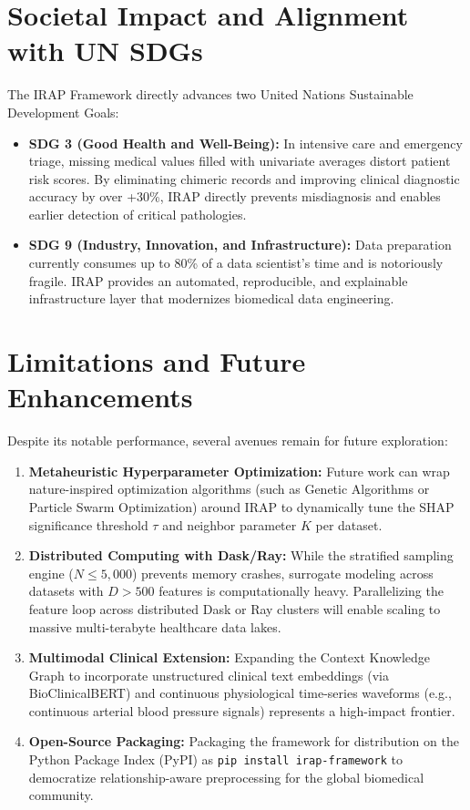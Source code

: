 \documentclass[MTech]{ugthesis}
\begin{document}
\section{Societal Impact and Alignment with UN SDGs}
The \ac{IRAP} Framework directly advances two United Nations Sustainable Development Goals:
\begin{itemize}
    \item \textbf{\ac{SDG} 3 (Good Health and Well-Being):} In intensive care and emergency triage, missing medical values filled with univariate averages distort patient risk scores. By eliminating chimeric records and improving clinical diagnostic accuracy by over +30\%, \ac{IRAP} directly prevents misdiagnosis and enables earlier detection of critical pathologies.
    \item \textbf{\ac{SDG} 9 (Industry, Innovation, and Infrastructure):} Data preparation currently consumes up to 80\% of a data scientist's time and is notoriously fragile. \ac{IRAP} provides an automated, reproducible, and explainable infrastructure layer that modernizes biomedical data engineering.
\end{itemize}

\section{Limitations and Future Enhancements}
Despite its notable performance, several avenues remain for future exploration:
\begin{enumerate}
    \item \textbf{Metaheuristic Hyperparameter Optimization:} Future work can wrap nature-inspired optimization algorithms (such as Genetic Algorithms or Particle Swarm Optimization) around \ac{IRAP} to dynamically tune the \ac{SHAP} significance threshold $\tau$ and neighbor parameter $K$ per dataset.
    \item \textbf{Distributed Computing with Dask/Ray:} While the stratified sampling engine ($N \le 5,000$) prevents memory crashes, surrogate modeling across datasets with $D > 500$ features is computationally heavy. Parallelizing the feature loop across distributed Dask or Ray clusters will enable scaling to massive multi-terabyte healthcare data lakes.
    \item \textbf{Multimodal Clinical Extension:} Expanding the Context Knowledge Graph to incorporate unstructured clinical text embeddings (via BioClinicalBERT) and continuous physiological time-series waveforms (e.g., continuous arterial blood pressure signals) represents a high-impact frontier.
    \item \textbf{Open-Source Packaging:} Packaging the framework for distribution on the Python Package Index (PyPI) as \texttt{pip install irap-framework} to democratize relationship-aware preprocessing for the global biomedical community.
\end{enumerate}
\end{document}
